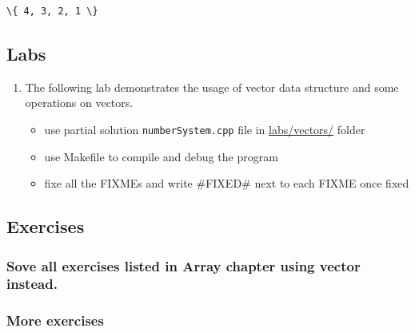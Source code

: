 \documentclass[11pt]{article}
\makeatletter
\providecommand{\tightlist}{%
      \setlength{\itemsep}{0pt}\setlength{\parskip}{0pt}}
\newcommand{\boxspacing}{\kern\kvtcb@left@rule\kern\kvtcb@boxsep}
\newcommand{\prompt}[4]{
        {\ttfamily\llap{{\color{#2}[#3]:\hspace{3pt}#4}}\vspace{-\baselineskip}}
    }
\makeatother
\begin{document}
            \begin{tcolorbox}[breakable, size=fbox, boxrule=.5pt, pad at break*=1mm, opacityfill=0]
\prompt{Out}{outcolor}{22}{\boxspacing}
\begin{Verbatim}[commandchars=\\\{\}]
\{ 4, 3, 2, 1 \}
\end{Verbatim}
\end{tcolorbox}
        
    \hypertarget{labs}{%
\subsection{Labs}\label{labs}}

\begin{enumerate}
\def\labelenumi{\arabic{enumi}.}
\tightlist
\item
  The following lab demonstrates the usage of vector data structure and
  some operations on vectors.

  \begin{itemize}
  \tightlist
  \item
    use partial solution \texttt{numberSystem.cpp} file in
    \href{./labs/vectors/}{labs/vectors/} folder
  \item
    use Makefile to compile and debug the program
  \item
    fixe all the FIXMEs and write \#FIXED\# next to each FIXME once
    fixed
  \end{itemize}
\end{enumerate}

    \hypertarget{exercises}{%
\subsection{Exercises}\label{exercises}}

\hypertarget{sove-all-exercises-listed-in-array-chapter-using-vector-instead.}{%
\subsubsection{Sove all exercises listed in Array chapter using vector
instead.}\label{sove-all-exercises-listed-in-array-chapter-using-vector-instead.}}

\hypertarget{more-exercises}{%
\subsubsection{More exercises}\label{more-exercises}}
\end{document}
